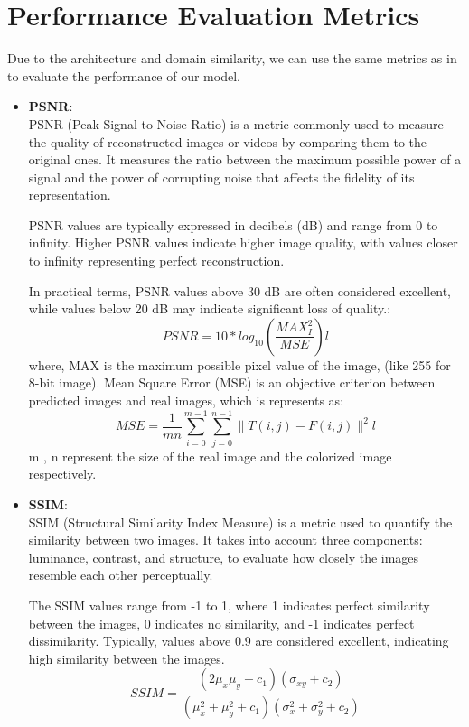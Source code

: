 \section{Performance Evaluation Metrics}
Due to the architecture and domain similarity, we can use the same metrics as in \cite{huang2021fully} to evaluate the performance of our model.\\
\begin{itemize}
  \item \textbf{PSNR}: \\
       PSNR (Peak Signal-to-Noise Ratio) is a metric commonly used to measure the quality of reconstructed images or videos by comparing them to the original ones. It measures the ratio between the maximum possible power of a signal and the power of corrupting noise that affects the fidelity of its representation.

PSNR values are typically expressed in decibels (dB) and range from 0 to infinity. Higher PSNR values indicate higher image quality, with values closer to infinity representing perfect reconstruction.

In practical terms, PSNR values above 30 dB are often considered excellent, while values below 20 dB may indicate significant loss of quality.:
        \begin{equation}
          PSNR = 10 * log_{10}\left(\frac{MAX_I^2}{MSE}\right)l
        \end{equation}
        where, MAX  is the maximum possible pixel value of the image, (like 255 for 8-bit image). Mean Square Error (MSE) is an objective criterion between predicted images and real images, which is represents as:
        \begin{equation}
          MSE = \frac{1}{mn} \sum_{i=0}^{m-1} \sum_{j=0}^{n-1} \|T(i, j) - F(i, j)\|^2 l
        \end{equation}
        m , n represent the size of the real image and the colorized image respectively.\\

  \item \textbf{SSIM}:\\
        SSIM (Structural Similarity Index Measure) is a metric used to quantify the similarity between two images. It takes into account three components: luminance, contrast, and structure, to evaluate how closely the images resemble each other perceptually.

The SSIM values range from -1 to 1, where 1 indicates perfect similarity between the images, 0 indicates no similarity, and -1 indicates perfect dissimilarity. Typically, values above 0.9 are considered excellent, indicating high similarity between the images.
        \begin{equation}
          SSIM = \frac{(2\mu_x\mu_y + c_1)(\sigma_{xy} + c_2)}{(\mu_x^2 + \mu_y^2 + c_1)(\sigma_x^2 + \sigma_y^2 + c_2)}
        \end{equation}


\end{itemize}
